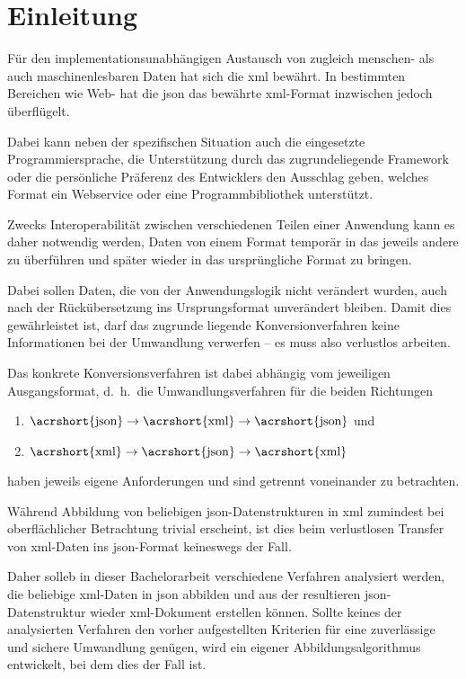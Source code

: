 \chapter{Einleitung} \label{chap:intro}
Für den implementationsunabhängigen Austausch von zugleich menschen- als auch
maschinenlesbaren Daten hat sich die \gls{xml}
bewährt. In bestimmten Bereichen wie Web- hat die \gls{json}
das bewährte \acrshort{xml}-Format inzwischen jedoch überflügelt.

Dabei kann neben der spezifischen Situation auch die eingesetzte
Programmiersprache, die Unterstützung durch das zugrundeliegende Framework
oder die persönliche Präferenz des Entwicklers den Ausschlag geben, welches
Format ein Webservice oder eine Programmbibliothek unterstützt.

Zwecks Interoperabilität zwischen verschiedenen Teilen einer Anwendung kann es
daher notwendig werden, Daten von einem Format temporär in das jeweils andere
zu überführen und später wieder in das ursprüngliche Format zu bringen.

Dabei sollen Daten, die von der Anwendungslogik nicht verändert wurden, auch
nach der Rückübersetzung ins Ursprungsformat unverändert bleiben. Damit dies
gewährleistet ist, darf das zugrunde liegende Konversionverfahren keine
Informationen bei der Umwandlung verwerfen -- es muss also verlustlos %
arbeiten.

Das konkrete Konversionsverfahren ist dabei abhängig vom jeweiligen
Ausgangsformat, d.~h.\ die Umwandlungsverfahren für die beiden Richtungen
\begin{enumerate}
    \item $\text{\acrshort{json}} \rightarrow \text{\acrshort{xml}} \rightarrow \text{\acrshort{json}}$ und
    \item $\text{\acrshort{xml}} \rightarrow \text{\acrshort{json}} \rightarrow \text{\acrshort{xml}}$
\end{enumerate}
haben jeweils eigene Anforderungen und sind getrennt voneinander zu betrachten.

Während Abbildung von beliebigen \acrshort{json}-Datenstrukturen in \acrshort{xml} zumindest bei
oberflächlicher Betrachtung trivial erscheint, ist dies beim verlustlosen
Transfer von \acrshort{xml}-Daten ins \acrshort{json}-Format keineswegs der Fall.

Daher solleb in dieser Bachelorarbeit verschiedene Verfahren analysiert
werden, die beliebige \acrshort{xml}-Daten in \acrshort{json} abbilden und aus der resultieren
\acrshort{json}-Datenstruktur wieder \acrshort{xml}-Dokument erstellen können. Sollte keines
der analysierten Verfahren den vorher aufgestellten Kriterien für eine
zuverlässige und sichere Umwandlung genügen, wird ein eigener
Abbildungsalgorithmus entwickelt, bei dem dies der Fall ist.

